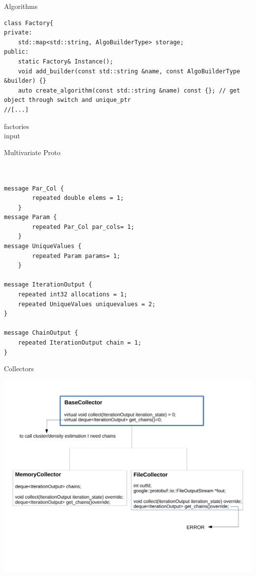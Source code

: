


\begin{frame}[fragile] {Algorithms}

\begin{verbatim}
class Factory{
private:
    std::map<std::string, AlgoBuilderType> storage;
public:
    static Factory& Instance();
    void add_builder(const std::string &name, const AlgoBuilderType &builder) {}
    auto create_algorithm(const std::string &name) const {}; // get object through switch and unique_ptr
//[...]
\end{verbatim}


factories \\
input

\end{frame}





\begin{frame}[fragile] {Multivariate Proto}

\begin{small}
\begin{verbatim}


message Par_Col {
        repeated double elems = 1;
    }
message Param {
        repeated Par_Col par_cols= 1;
    }
message UniqueValues {
        repeated Param params= 1;
    }

message IterationOutput {
    repeated int32 allocations = 1;
    repeated UniqueValues uniquevalues = 2;
}

message ChainOutput {
    repeated IterationOutput chain = 1;
}

\end{verbatim}

\end{small}
\end{frame}


\begin{frame}{Collectors}
	\begin{center}
		\includegraphics[scale=0.35]{etc/collectors.pdf}
	\end{center}
\end{frame}
